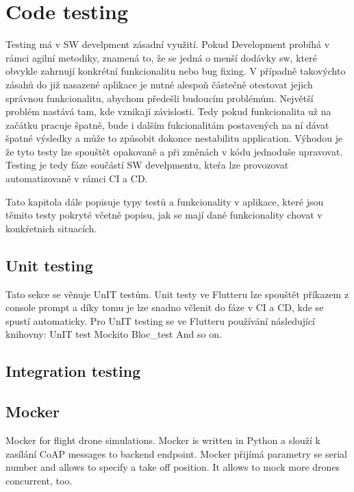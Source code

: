 \chapter{Code testing}\label{ch:code-testing}
Testing má v SW develpment zásadní využití.
Pokud Development probíhá v rámci agilní metodiky, znamená to, že se jedná o menší dodávky sw, které obvykle zahrnují konkrétní funkcionalitu nebo bug fixing.
V případně takovýchto zásahů do již nasazené aplikace je nutné alespoň částečně otestovat jejich správnou funkcionalitu, abychom předešli budoucím problémům.
Největší problém nastává tam, kde vznikají závislosti.
Tedy pokud funkcionalita už na začátku pracuje špatně, bude i dalším fukcionalitám postavených na ní dávat špatné výsledky a může to způsobit dokonce nestabilitu application.
Výhodou je že tyto testy lze spouštět opakovaně a při změnách v kódu jednoduše upravovat.
Testing je tedy fáze součástí SW develpmentu, kteŕa lze provozovat automatizovaně v rámci CI a CD.

Tato kapitola dále popisuje typy testů a funkcionality v aplikace, které jsou těmito testy pokryté včetně popisu, jak se mají dané funkcionality chovat v konkŕetnich situacích.

\section{Unit testing}\label{sec:unit-testing}
Tato sekce se věnuje  UnIT testům.
Unit testy ve Flutteru lze spouštět příkazem z console prompt a díky tomu je lze snadno včlenit do fáze v CI a CD, kde se spustí automaticky.
Pro UnIT testing se ve Flutteru používání následující knihovny:
UnIT test
Mockito
Bloc\_test
And so on.


\section{Integration testing}\label{sec:integration-testing}

\section{Mocker}\label{sec:mocker}
Mocker for flight drone simulations.
Mocker is written in Python a slouží k zasílání CoAP messages to backend endpoint.
Mocker přijímá parametry se serial number and allows to specify a take off position.
It allows to mock more drones concurrent, too.
